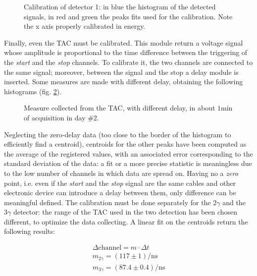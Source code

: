 \documentclass[11pt,a4 paper]{article}
\begin{document}
\begin{figure}[H]
    \centering
    \caption{Calibration of detector 1: in blue the histogram of the detected signals, in red and green the peaks fits used for the calibration. Note the x axis properly calibrated in energy.}
    \label{fig:det1_calibr}
\end{figure}


Finally, even the TAC must be calibrated. This module return a voltage signal whose amplitude is proportional to the time difference between the triggering of the \emph{start} and the \emph{stop} channels. To calibrate it, the two channels are connected to the same signal; moreover, between the signal and the stop a delay module is inserted. Some measures are made with different delay, obtaining the following histograms (fig. \ref{fig:tachisto}).

\begin{figure}[H]
    \centering
    \caption{Measure collected from the TAC, with different delay, in about $1\si{\minute}$ of acquisition in day \#2.}
    \label{fig:tachisto}
\end{figure}

Neglecting the zero-delay data (too close to the border of the histogram to efficiently find a centroid), centroids for the other peaks have been computed as the average of the registered values, with an associated error corresponding to the standard deviation of the data: a fit or a more precise statistic is meaningless due to the low number of channels in which data are spread on.  Having no a \emph{zero} point, i.e. even if the \emph{start} and the \emph{stop} signal are the same cables and other electronic device can introduce a delay between them, only difference can be meaningful defined. The calibration must be done separately for the $2\gamma$ and the $3\gamma$ detector: the range of the TAC used in the two detection has been chosen different, to optimize the data collecting. A linear fit on the centroids return the following results:

\begin{gather*}
    \Delta\text{channel}  = m \cdot \Delta t \\
    m_{2\gamma} = ( 117 \pm 1 )\si{\per\nano\second} \\
    m_{3\gamma} = ( 87.4 \pm 0.4 )\si{\per\nano\second}
\end{gather*}
\end{document}
